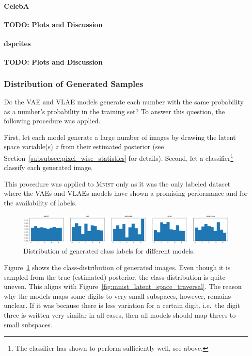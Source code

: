 \paragraph{CelebA}
\textbf{TODO: Plots and Discussion}

\paragraph{dsprites}
\textbf{TODO: Plots and Discussion}

\subsubsection{Distribution of Generated Samples}

Do the \ac{VAE} and \ac{VLAE} models generate each number with the same probability as a number's probability in the training set?
To answer this question, the following procedure was applied.

First, let each model generate a large number of images by drawing the latent space variable(s) $z$ from their estimated posterior (see Section~\ref{subsubsec:pixel_wise_statistics} for details).
Second, let a classifier\footnote{The classifier has shown to perform sufficiently well, see above.} classify each generated image.

This procedure was applied to \textsc{Mnist} only as it was the only labeled dataset where the \acp{VAE} and \acp{VLAE} models have shown a promising performance and for the availability of labels.

\begin{figure}
    \centering
    \includegraphics[width=\textwidth]{images/generated_vs_true/class_distr.png}
    \caption{Distribution of generated class labels for different models.}
    \label{fig:generated_class_distribution}
\end{figure}

Figure~\ref{fig:generated_class_distribution} shows the class-distribution of generated images.
Even though it is sampled from the true (estimated) posterior, the class distribution is quite uneven.
This aligns with Figure~\ref{fig:mnist_latent_space_traversal}.
The reason why the models maps some digits to very small subspaces, however, remains unclear.
If it was because there is less variation for a certain digit, i.e.~the digit three is written very similar in all cases, then all models should map threes to small subspaces.

